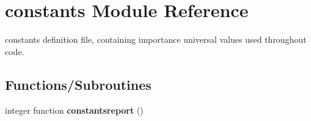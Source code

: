 \hypertarget{namespaceconstants}{}\section{constants Module Reference}
\label{namespaceconstants}


constants definition file, containing importance universal values used throughout code.  


\subsection*{Functions/\+Subroutines}
\begin{DoxyCompactItemize}
\item 
\mbox{\label{namespaceconstants_a3e4c3a4d617eed3c544b480d47b0350f}} 
integer function {\bfseries constantsreport} ()
\end{DoxyCompactItemize}
